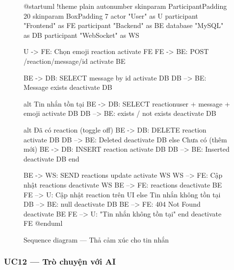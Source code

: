 \documentclass[12pt,a4paper]{report}
\begin{document}
\begin{figure}[H]
    \centering
    \begin{plantuml}
        @startuml
        !theme plain
        autonumber
        skinparam ParticipantPadding 20
        skinparam BoxPadding 7
        actor "User" as U
        participant "Frontend" as FE
        participant "Backend" as BE
        database "MySQL" as DB
        participant "WebSocket" as WS

        U -> FE: Chọn emoji reaction
        activate FE
        FE -> BE: POST /reaction/message/{id}
        activate BE

        BE -> DB: SELECT message by id
        activate DB
        DB --> BE: Message exists
        deactivate DB

        alt Tin nhắn tồn tại
          BE -> DB: SELECT reaction\nWHERE user + message + emoji
          activate DB
          DB --> BE: exists / not exists
          deactivate DB

          alt Đã có reaction (toggle off)
            BE -> DB: DELETE reaction
            activate DB
            DB --> BE: Deleted
            deactivate DB
          else Chưa có (thêm mới)
            BE -> DB: INSERT reaction
            activate DB
            DB --> BE: Inserted
            deactivate DB
          end

          BE -> WS: SEND reactions update
          activate WS
          WS --> FE: Cập nhật reactions
          deactivate WS
          BE --> FE: { reactions }
          deactivate BE
          FE --> U: Cập nhật reaction trên UI
        else Tin nhắn không tồn tại
          DB --> BE: null
          deactivate DB
          BE --> FE: 404 Not Found
          deactivate BE
          FE --> U: "Tin nhắn không tồn tại"
        end
        deactivate FE
        @enduml
    \end{plantuml}
    \caption{Sequence diagram --- Thả cảm xúc cho tin nhắn}
\end{figure}

\subsubsection{UC12 --- Trò chuyện với AI}
\end{document}
